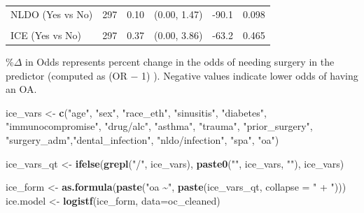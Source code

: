 \documentclass[
]{article}
\newenvironment{Shaded}{\begin{snugshade}}{\end{snugshade}}
\newcommand{\AttributeTok}[1]{\textcolor[rgb]{0.13,0.29,0.53}{#1}}
\newcommand{\FunctionTok}[1]{\textcolor[rgb]{0.13,0.29,0.53}{\textbf{#1}}}
\newcommand{\NormalTok}[1]{#1}
\newcommand{\OtherTok}[1]{\textcolor[rgb]{0.56,0.35,0.01}{#1}}
\newcommand{\StringTok}[1]{\textcolor[rgb]{0.31,0.60,0.02}{#1}}
\begin{document}
\begin{table}[t]
\begin{tabular*}{0.85\linewidth}{@{\extracolsep{\fill}}lrrrrr}
NLDO (Yes vs No) & 297 & 0.10 & (0.00, 1.47) & -90.1 & 0.098 \\ 
{\cellcolor[HTML]{FFF3CD}{SPA (Yes vs No)}} & {\cellcolor[HTML]{FFF3CD}{297}} & {\cellcolor[HTML]{FFF3CD}{0.03}} & {\cellcolor[HTML]{FFF3CD}{(0.00, 0.22)}} & {\cellcolor[HTML]{FFF3CD}{-97.1}} & {\cellcolor[HTML]{FFF3CD}{<0.001}} \\ 
ICE (Yes vs No) & 297 & 0.37 & (0.00, 3.86) & -63.2 & 0.465 \\ 
\bottomrule
\end{tabular*}
\begin{minipage}{\linewidth}
\%\ensuremath{\Delta} in Odds represents percent change in the odds of needing surgery
    in the predictor (computed as (OR \ensuremath{-} 1) ). Negative values indicate lower
    odds of having an OA.\\
\end{minipage}
\end{table}

\begin{Shaded}
\begin{Highlighting}[]
\NormalTok{ice\_vars }\OtherTok{\textless{}{-}} \FunctionTok{c}\NormalTok{(}\StringTok{"age"}\NormalTok{, }\StringTok{"sex"}\NormalTok{, }\StringTok{"race\_eth"}\NormalTok{, }\StringTok{"sinusitis"}\NormalTok{, }\StringTok{"diabetes"}\NormalTok{,}
              \StringTok{"immunocompromise"}\NormalTok{, }\StringTok{"drug/alc"}\NormalTok{, }\StringTok{"asthma"}\NormalTok{, }\StringTok{"trauma"}\NormalTok{, }
              \StringTok{"prior\_surgery"}\NormalTok{, }\StringTok{"surgery\_adm"}\NormalTok{,}\StringTok{"dental\_infection"}\NormalTok{,}
              \StringTok{"nldo/infection"}\NormalTok{, }\StringTok{"spa"}\NormalTok{, }\StringTok{"oa"}\NormalTok{)}

\NormalTok{ice\_vars\_qt }\OtherTok{\textless{}{-}} \FunctionTok{ifelse}\NormalTok{(}\FunctionTok{grepl}\NormalTok{(}\StringTok{"/"}\NormalTok{, ice\_vars), }
                      \FunctionTok{paste0}\NormalTok{(}\StringTok{"\textasciigrave{}"}\NormalTok{, ice\_vars, }\StringTok{"\textasciigrave{}"}\NormalTok{), ice\_vars)}

\NormalTok{ice\_form }\OtherTok{\textless{}{-}} \FunctionTok{as.formula}\NormalTok{(}\FunctionTok{paste}\NormalTok{(}\StringTok{"oa \textasciitilde{}"}\NormalTok{, }\FunctionTok{paste}\NormalTok{(ice\_vars\_qt, }\AttributeTok{collapse =} \StringTok{" + "}\NormalTok{)))}
\NormalTok{ice.model }\OtherTok{\textless{}{-}} \FunctionTok{logistf}\NormalTok{(ice\_form, }\AttributeTok{data=}\NormalTok{oc\_cleaned)}
\end{Highlighting}
\end{Shaded}
\end{document}
